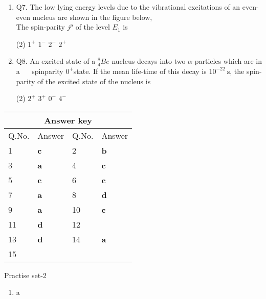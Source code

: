 \begin{enumerate}
\begin{tasks}
\end{tasks}
	\item Q7. The low lying energy levels due to the vibrational excitations of an even-even nucleus are shown in the figure below,\\
	The spin-parity $j^p$ of the level $E_1$ is
	{}
 \begin{tasks}(2)
	\task[\textbf{a.}]$1^{+}$
	\task[\textbf{b.}]$1^{-}$
	\task[\textbf{c.}]$2^{-}$
	\task[\textbf{d.}]$2^{+}$ 
\end{tasks}
	 \item Q8. An excited state of a ${ }_4^8 B e$ nucleus decays into two $\alpha$-particles which are in a $\quad$ spinparity $0^{+}$state. If the mean life-time of this decay is $10^{-22} \mathrm{~s}$, the spin-parity of the excited state of the nucleus is
	 \begin{tasks}(2)
		\task[\textbf{a.}]$2^{+}$
		\task[\textbf{b.}]$3^{+}$
		\task[\textbf{c.}]$0^{-}$
		\task[\textbf{d.}]$4^{-}$ 
	\end{tasks}
\end{enumerate}
\setlength\arrayrulewidth{1pt}
\begin{table}[H]
	\centering
	\begin{tabular}{|p{1.5cm}|p{1.5cm}||p{1.5cm}|p{1.5cm}|}
		\hline
		\multicolumn{4}{|c|}{\textbf{Answer key}}\\\hline\hline
		\rowcolor{ocrel}Q.No.&Answer&Q.No.&Answer\\\hline
		1&\textbf{c} &2&\textbf{b}\\\hline 
		3&\textbf{a} &4&\textbf{c} \\\hline
		5&\textbf{c} &6&\textbf{c} \\\hline
		7&\textbf{a}&8&\textbf{d}\\\hline
		9&\textbf{a}&10&\textbf{c}\\\hline
		11&\textbf{d} &12&\textbf{}\\\hline
		13&\textbf{d}&14&\textbf{a}\\\hline
		15&\textbf{}& &\\\hline
		
	\end{tabular}
\end{table}
\newpage
\begin{abox}
	Practise set-2
	\end{abox}
\begin{enumerate}
	\item a
	
	
	
	
	
	
	
	
	
	
	
	
	
	
	
	
	
	
\end{enumerate}

